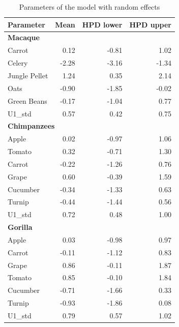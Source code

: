 \documentclass[
]{book}
\begin{document}
\begin{table}

\caption{\label{tab:unnamed-chunk-62}Parameters of the model with random effects}
\centering
\begin{tabular}[t]{l|r|r|r}
\hline
Parameter & Mean & HPD lower & HPD upper\\
\hline
\multicolumn{4}{l}{\textbf{Macaque}}\\
\hline
\hspace{1em}Carrot & 0.12 & -0.81 & 1.02\\
\hline
\hspace{1em}Celery & -2.28 & -3.16 & -1.34\\
\hline
\hspace{1em}Jungle Pellet & 1.24 & 0.35 & 2.14\\
\hline
\hspace{1em}Oats & -0.90 & -1.85 & -0.02\\
\hline
\hspace{1em}Green Beans & -0.17 & -1.04 & 0.77\\
\hline
\hspace{1em}U1\_std & 0.57 & 0.42 & 0.75\\
\hline
\multicolumn{4}{l}{\textbf{Chimpanzees}}\\
\hline
\hspace{1em}Apple & 0.02 & -0.97 & 1.06\\
\hline
\hspace{1em}Tomato & 0.32 & -0.71 & 1.30\\
\hline
\hspace{1em}Carrot & -0.22 & -1.26 & 0.76\\
\hline
\hspace{1em}Grape & 0.60 & -0.39 & 1.59\\
\hline
\hspace{1em}Cucumber & -0.34 & -1.33 & 0.63\\
\hline
\hspace{1em}Turnip & -0.44 & -1.44 & 0.56\\
\hline
\hspace{1em}U1\_std & 0.72 & 0.48 & 1.00\\
\hline
\multicolumn{4}{l}{\textbf{Gorilla}}\\
\hline
\hspace{1em}Apple & 0.03 & -0.98 & 0.97\\
\hline
\hspace{1em}Carrot & -0.11 & -1.12 & 0.83\\
\hline
\hspace{1em}Grape & 0.86 & -0.11 & 1.87\\
\hline
\hspace{1em}Tomato & 0.85 & -0.10 & 1.84\\
\hline
\hspace{1em}Cucumber & -0.71 & -1.66 & 0.33\\
\hline
\hspace{1em}Turnip & -0.93 & -1.86 & 0.08\\
\hline
\hspace{1em}U1\_std & 0.79 & 0.57 & 1.02\\
\hline
\end{tabular}
\end{table}
\end{document}
